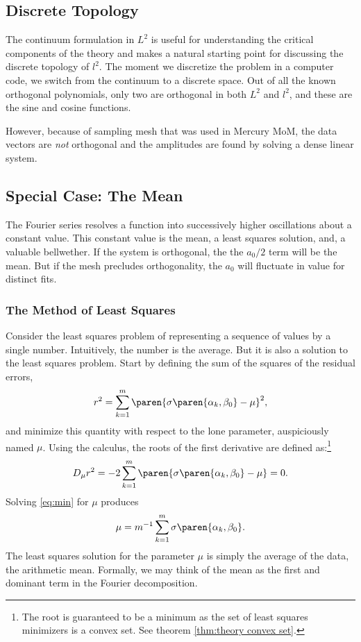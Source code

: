\subsection{Discrete Topology}
The continuum formulation in $L^{2}$ is useful for understanding the critical components of the theory and makes a natural starting point for discussing the discrete topology of $l^{2}$. The moment we discretize the problem in a computer code, we switch from the continuum to a discrete space. Out of all the known orthogonal polynomials, only two are orthogonal in both $L^{2}$ and $l^{2}$, and these are the sine and cosine functions. 

However, because of sampling mesh that was used in Mercury MoM, the data vectors are {\it{not}} orthogonal and the amplitudes are found by solving a dense linear system.

\subsection{\label{sec:special-case}Special Case: The Mean}
The Fourier series resolves a function into successively higher oscillations about a constant value. This constant value is the mean, a least squares solution, and, a valuable bellwether. If the system is orthogonal, the the $a_{0}/2$ term will be the mean. But if the mesh precludes orthogonality, the $a_{0}$ will fluctuate in value for distinct fits.

\subsubsection{The Method of Least Squares}
Consider the least squares problem of representing a sequence of values by a single number. Intuitively, the number is the average. But it is also a solution to the least squares problem. Start by defining the sum of the squares of the residual errors,
\begin{equation}
	r^{2} = \sum_{k=1}^{m} \paren{ \sigma\paren{\alpha_{k},\beta_{0}} - \mu }^{2},
\end{equation}
and minimize this quantity with respect to the lone parameter, auspiciously named $\mu$. Using the calculus, the roots of the first derivative are defined as:\footnote{The root is guaranteed to be a minimum as the set of least squares minimizers is a convex set. See theorem \ref{thm:theory convex set}.}
\begin{equation}
	D_{\mu} r^{2} = -2 \sum_{k=1}^{m} \paren{ \sigma\paren{\alpha_{k},\beta_{0}} - \mu } = 0.
\label{eq:min}
\end{equation}
Solving \eqref{eq:min} for $\mu$ produces
\begin{equation}
	\mu = m^{-1}\sum_{k=1}^{m} \sigma\paren{\alpha_{k},\beta_{0}}.
\label{eq:mu}
\end{equation}
The least squares solution for the parameter $\mu$ is simply the average of the data, the arithmetic mean. Formally, we may think of the mean as the first and dominant term in the Fourier decomposition.

